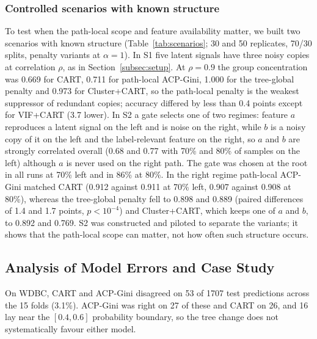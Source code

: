 \documentclass[pdflatex,sn-basic,Numbered]{sn-jnl}
\begin{document}
\subsubsection{Controlled scenarios with known structure}\label{subsec:scenarios}
To test when the path-local scope and feature availability matter, we built two scenarios with known structure (Table~\ref{tab:scenarios}; 30 and 50 replicates, 70/30 splits, penalty variants at $\alpha=1$). In S1 five latent signals have three noisy copies at correlation $\rho$, as in Section~\ref{subsec:setup}. At $\rho=0.9$ the group concentration was 0.669 for CART, 0.711 for path-local ACP-Gini, 1.000 for the tree-global penalty and 0.973 for Cluster+CART, so the path-local penalty is the weakest suppressor of redundant copies; accuracy differed by less than 0.4 points except for VIF+CART (3.7 lower). In S2 a gate selects one of two regimes: feature $a$ reproduces a latent signal on the left and is noise on the right, while $b$ is a noisy copy of it on the left and the label-relevant feature on the right, so $a$ and $b$ are strongly correlated overall (0.68 and 0.77 with 70\% and 80\% of samples on the left) although $a$ is never used on the right path. The gate was chosen at the root in all runs at 70\% left and in 86\% at 80\%. In the right regime path-local ACP-Gini matched CART (0.912 against 0.911 at 70\% left, 0.907 against 0.908 at 80\%), whereas the tree-global penalty fell to 0.898 and 0.889 (paired differences of 1.4 and 1.7 points, $p<10^{-4}$) and Cluster+CART, which keeps one of $a$ and $b$, to 0.892 and 0.769. S2 was constructed and piloted to separate the variants; it shows that the path-local scope can matter, not how often such structure occurs.

\begin{table}[!htbp]\centering\caption{Controlled scenarios, mean over replicates. S1: group concentration and accuracy at $\rho=0.9$. S2: accuracy in the right regime with 70\% and 80\% of samples on the left, and overall accuracy at 80\%. Bold marks ACP-Gini where it is the best of all methods.}\label{tab:scenarios}\tiny\setlength{\tabcolsep}{2pt}\end{table}

\subsection{Analysis of Model Errors and Case Study}
On WDBC, CART and ACP-Gini disagreed on 53 of 1707 test predictions across the 15 folds (3.1\%). ACP-Gini was right on 27 of these and CART on 26, and 16 lay near the $[0.4,0.6]$ probability boundary, so the tree change does not systematically favour either model.
\end{document}
